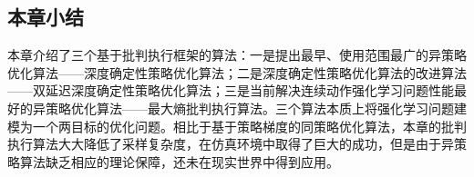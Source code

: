 \subsection{本章小结}

本章介绍了三个基于批判执行框架的算法：一是提出最早、使用范围最广的异策略优化算法——深度确定性策略优化算法；二是深度确定性策略优化算法的改进算法——双延迟深度确定性策略优化算法；三是当前解决连续动作强化学习问题性能最好的异策略优化算法——最大熵批判执行算法。三个算法本质上将强化学习问题建模为一个两目标的优化问题。相比于基于策略梯度的同策略优化算法，本章的批判执行算法大大降低了采样复杂度，在仿真环境中取得了巨大的成功，但是由于异策略算法缺乏相应的理论保障，还未在现实世界中得到应用。